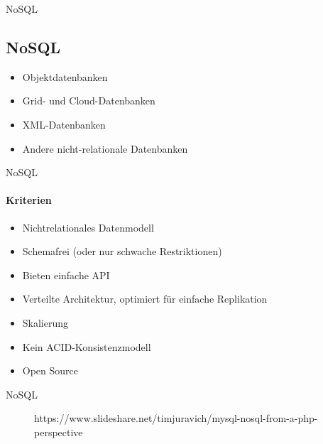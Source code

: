 \documentclass[11pt]{beamer}
\begin{document}
\begin{frame}{NoSQL}
\subsection{NoSQL}
\begin{itemize}
\item Objektdatenbanken
\item Grid- und Cloud-Datenbanken
\item XML-Datenbanken
\item Andere nicht-relationale Datenbanken
\end{itemize}
\end{frame}

\begin{frame}{NoSQL}
\framesubtitle{Kriterien}
\begin{itemize}
\item Nichtrelationales Datenmodell
\item Schemafrei (oder nur schwache Restriktionen)
\item Bieten einfache API
\item Verteilte Architektur, optimiert für einfache Replikation 
\item Skalierung
\item Kein ACID-Konsistenzmodell
\item Open Source
\end{itemize}
\end{frame}

\begin{frame}{NoSQL}
\begin{figure}
		\caption{https://www.slideshare.net/timjuravich/mysql-nosql-from-a-php-perspective}
\end{figure}
\end{frame}
\end{document}
